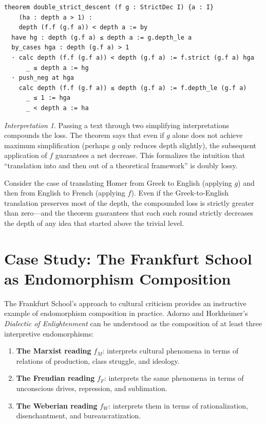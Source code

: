 \documentclass[11pt,openany]{book}
\theoremstyle{definition}
\theoremstyle{plain}
\theoremstyle{remark}
\newtheorem{interpretation}[axiom]{Interpretation}
\begin{document}
\begin{lstlisting}[language=Lean4]
theorem double_strict_descent (f g : StrictDec I) {a : I}
    (ha : depth a > 1) :
    depth (f.f (g.f a)) < depth a := by
  have hg : depth (g.f a) ≤ depth a := g.depth_le a
  by_cases hga : depth (g.f a) > 1
  · calc depth (f.f (g.f a)) < depth (g.f a) := f.strict (g.f a) hga
      _ ≤ depth a := hg
  · push_neg at hga
    calc depth (f.f (g.f a)) ≤ depth (g.f a) := f.depth_le (g.f a)
      _ ≤ 1 := hga
      _ < depth a := ha
\end{lstlisting}

\begin{interpretation}
Passing a text through two simplifying interpretations compounds the loss. The theorem says that even if $g$ alone does not achieve maximum simplification (perhaps $g$ only reduces depth slightly), the subsequent application of $f$ guarantees a net decrease. This formalizes the intuition that ``translation into and then out of a theoretical framework'' is doubly lossy.

Consider the case of translating Homer from Greek to English (applying $g$) and then from English to French (applying $f$). Even if the Greek-to-English translation preserves most of the depth, the compounded loss is strictly greater than zero---and the theorem guarantees that each such round strictly decreases the depth of any idea that started above the trivial level.
\end{interpretation}

\section{Case Study: The Frankfurt School as Endomorphism Composition}

The Frankfurt School's approach to cultural criticism provides an instructive example of endomorphism composition in practice. Adorno and Horkheimer's \textit{Dialectic of Enlightenment} can be understood as the composition of at least three interpretive endomorphisms:

\begin{enumerate}
\item \textbf{The Marxist reading} $f_M$: interprets cultural phenomena in terms of relations of production, class struggle, and ideology.
\item \textbf{The Freudian reading} $f_F$: interprets the same phenomena in terms of unconscious drives, repression, and sublimation.
\item \textbf{The Weberian reading} $f_W$: interprets them in terms of rationalization, disenchantment, and bureaucratization.
\end{enumerate}
\end{document}
